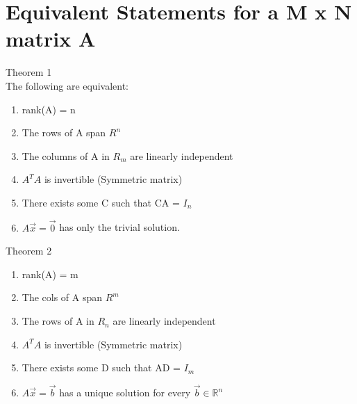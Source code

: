 \documentclass[10pt, twocolumn]{report}
\begin{document}
\section{Equivalent Statements for a M x N matrix A}
Theorem 1\\
The following are equivalent:
\begin{enumerate}
    \item rank(A) = n
    \item The rows of A span $R^n$
    \item The columns of A in $R_m$ are linearly independent
    \item $A^T A$ is invertible (Symmetric matrix)
    \item There exists some C such that CA = $I_n$
    \item $A\vec x = \vec 0$ has only the trivial solution.
\end{enumerate}
Theorem 2\\
\begin{enumerate}
    \item rank(A) = m
    \item The cols of A span $R^m$
    \item The rows of A in $R_n$ are linearly independent
    \item $A^T A$ is invertible (Symmetric matrix)
    \item There exists some D such that AD = $I_m$
    \item $A\vec x = \vec b$ has a unique solution for every $\vec b \in \mathbb R^n$
\end{enumerate}
\end{document}
